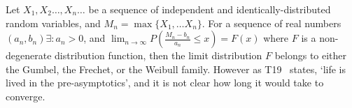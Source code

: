 
Let $X_{1}, X_{2} \ldots, X_{n} \ldots$ be a sequence of independent and
identically-distributed random variables, and $M_n = \max\{X_1, \ldots X_n\}$.
For a sequence of real numbers $(a_n, b_n) \exists: a_n>0$, and
$\lim _{n \rightarrow \infty} P\left(\frac{M_{n}-b_{n}}{a_{n}} \leq x\right)=F(x)$
where $F$ is a non-degenerate distribution function, then the limit distribution
$F$ belongs to either the Gumbel, the Frechet, or the Weibull family.
However as T19~\cite{taleb2019statistical} states, `life is lived in the pre-asymptotics',
and it is not clear how long it would take to converge.
